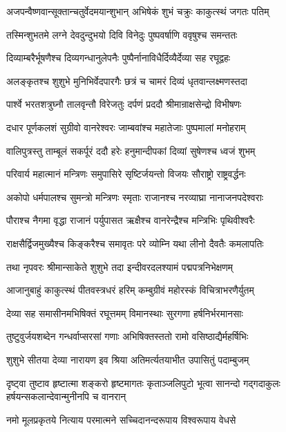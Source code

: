 \twolineshloka
{अजपन्वैष्णवान्सूक्तान्चतुर्वेदमयान्शुभान्}
{अभिषेकं शुभं चक्रुः काकुत्स्थं जगतः पतिम्}%

\twolineshloka
{तस्मिन्शुभतमे लग्ने देवदुन्दुभयो दिवि}
{विनेदुः पुष्पवर्षाणि ववृषुश्च समन्ततः}%

\twolineshloka
{दिव्याम्बरैर्भूषणैश्च दिव्यगन्धानुलेपनैः}
{पुष्पैर्नानाविधैर्दिव्यैर्देव्या सह रघूद्वहः}%

\twolineshloka
{अलङ्कृतश्च शुशुभे मुनिभिर्वेदपारगैः}
{छत्रं च चामरं दिव्यं धृतवान्लक्ष्मणस्तदा}%

\twolineshloka
{पार्श्वे भरतशत्रुघ्नौ तालवृन्तौ विरेजतुः}
{दर्पणं प्रददौ श्रीमान्राक्षसेन्द्रो विभीषणः}%

\twolineshloka
{दधार पूर्णकलशं सुग्रीवो वानरेश्वरः}
{जाम्बवांश्च महातेजाः पुष्पमालां मनोहराम्}%

\twolineshloka
{वालिपुत्रस्तु ताम्बूलं सकर्पूरं ददौ हरेः}
{हनुमान्दीपकां दिव्यां सुषेणश्च ध्वजं शुभम्}%

\twolineshloka
{परिवार्य महात्मानं मन्त्रिणः समुपासिरे}
{सृष्टिर्जयन्तो विजयः सौराष्ट्रो राष्ट्रवर्द्धनः}%

\twolineshloka
{अकोपो धर्मपालश्च सुमन्त्रो मन्त्रिणः स्मृताः}
{राजानश्च नरव्याघ्रा नानाजनपदेश्वराः}%

\twolineshloka
{पौराश्च नैगमा वृद्धा राजानं पर्युपासत}
{ऋक्षैश्च वानरेन्द्रैश्च मन्त्रिभिः पृथिवीश्वरैः}%

\twolineshloka
{राक्षसैर्द्विजमुख्यैश्च किङ्करैश्च समावृतः}
{परे व्योम्नि यथा लीनो दैवतैः कमलापतिः}%

\twolineshloka
{तथा नृपवरः श्रीमान्साकेते शुशुभे तदा}
{इन्दीवरदलश्यामं पद्मपत्रनिभेक्षणम्}%

\twolineshloka
{आजानुबाहुं काकुत्स्थं पीतवस्त्रधरं हरिम्}
{कम्बुग्रीवं महोरस्कं विचित्राभरणैर्युतम्}%

\twolineshloka
{देव्या सह समासीनमभिषिक्तं रघूत्तमम्}
{विमानस्थाः सुरगणा हर्षनिर्भरमानसाः}%

\twolineshloka
{तुष्टुवुर्जयशब्देन गन्धर्वाप्सरसां गणाः}
{अभिषिक्तस्ततो रामो वसिष्ठाद्यैर्महर्षिभिः}%

\twolineshloka
{शुशुभे सीतया देव्या नारायण इव श्रिया}
{अतिमर्त्यतयाभीत उपासितुं पदाम्बुजम्}%

\threelineshloka
{दृष्ट्वा तुष्टाव हृष्टात्मा शङ्करो हृष्टमागतः}
{कृताञ्जलिपुटो भूत्वा सानन्दो गद्गदाकुलः}
{हर्षयन्सकलान्देवान्मुनीनपि च वानरान्}%


\twolineshloka
{नमो मूलप्रकृतये नित्याय परमात्मने}
{सच्चिदानन्दरूपाय विश्वरूपाय वेधसे}%


